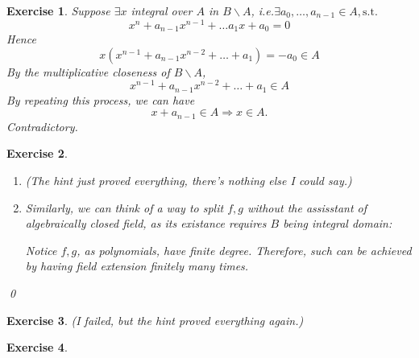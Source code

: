 \documentclass{article}
\theoremstyle{breakstyle}
\newtheorem{exercise}{Exercise}[section]
\begin{document}
\begin{exercise}
    Suppose $\exists x$ integral over $A$ in $B\backslash A$,
    i.e.$\exists a_0,\ldots ,a_{n-1}\in A,\text{s.t. }$
    $$
    x^{n}+a_{n-1}x^{n-1}+\ldots a_1x+a_0=0
    $$
    Hence
    $$
    x(x^{n-1}+a_{n-1}x^{n-2}+\ldots +a_1)=-a_0\in A
    $$
    By the multiplicative closeness of $B\backslash A$,
    $$
    x^{n-1}+a_{n-1}x^{n-2}+\ldots +a_1\in A
    $$
    By repeating this process, we can have
    $$
    x+a_{n-1}\in A\Rightarrow x\in A
    .$$
    Contradictory.
\end{exercise}

\begin{exercise}
    \leavevmode \vspace{-\baselineskip}
    \begin{enumerate}[label=({\roman*})]
        \item 
            \emph{(The hint just proved everything, there's nothing else I could say.)}
        \item 
            Similarly, we can think of a way to split $f,g$ without the
            assisstant of algebraically closed field, as its existance requires
            $B$ being integral domain:

            Notice $f,g$, as polynomials, have finite degree. Therefore, such
            can be achieved by having field extension finitely many times.
    \end{enumerate}
    \qed
\end{exercise}

\begin{exercise}
        \emph{(I failed, but the hint proved everything again.)}
\end{exercise}

\begin{exercise}
    
\end{exercise}
\end{document}
